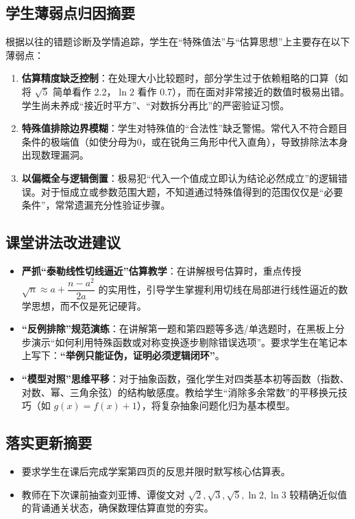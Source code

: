 \documentclass[12pt,a4paper]{ctexart}
\begin{document}
\subsection{学生薄弱点归因摘要}
根据以往的错题诊断及学情追踪，学生在“特殊值法”与“估算思想”上主要存在以下薄弱点：
\begin{enumerate}[label=\arabic*. , leftmargin=2em, itemsep=0.1em, topsep=0.2em]
  \item \textbf{估算精度缺乏控制}：在处理大小比较题时，部分学生过于依赖粗略的口算（如将 \(\sqrt{5}\) 简单看作 2.2，\(\ln 2\) 看作 0.7），而在面对非常接近的数值时极易出错。学生尚未养成“接近时平方”、“对数拆分再比”的严密验证习惯。
  \item \textbf{特殊值排除边界模糊}：学生对特殊值的“合法性”缺乏警惕。常代入不符合题目条件的极端值（如使分母为0，或在锐角三角形中代入直角），导致排除法本身出现数理漏洞。
  \item \textbf{以偏概全与逻辑倒置}：极易犯“代入一个值成立即认为结论必然成立”的逻辑错误。对于恒成立或参数范围大题，不知道通过特殊值得到的范围仅仅是“必要条件”，常常遗漏充分性验证步骤。
\end{enumerate}

\subsection{课堂讲法改进建议}
\begin{itemize}[leftmargin=2em, itemsep=0.1em, topsep=0.2em]
  \item \textbf{严抓“泰勒线性切线逼近”估算教学}：在讲解根号估算时，重点传授 \(\sqrt{n} \approx a + \dfrac{n-a^2}{2a}\) 的实用性，引导学生掌握利用切线在局部进行线性逼近的数学思想，而不仅是死记硬背。
  \item \textbf{“反例排除”规范演练}：在讲解第一题和第四题等多选/单选题时，在黑板上分步演示“如何利用特殊函数或对称变换逐步剔除错误选项”。要求学生在笔记本上写下：\textbf{“举例只能证伪，证明必须逻辑闭环”}。
  \item \textbf{“模型对照”思维平移}：对于抽象函数，强化学生对四类基本初等函数（指数、对数、幂、三角余弦）的结构敏感度。教给学生“消除多余常数”的平移换元技巧（如 \(g(x)=f(x)+1\)），将复杂抽象问题化归为基本模型。
\end{itemize}

\subsection{落实更新摘要}
\begin{itemize}[leftmargin=2em, itemsep=0.1em, topsep=0.2em]
  \item 要求学生在课后完成学案第四页的反思并限时默写核心估算表。
  \item 教师在下次课前抽查刘亚博、谭俊文对 \(\sqrt{2},\sqrt{3},\sqrt{5},\ln 2,\ln 3\) 较精确近似值的背诵通关状态，确保数理估算直觉的夯实。
\end{itemize}

\endgroup
\end{document}
